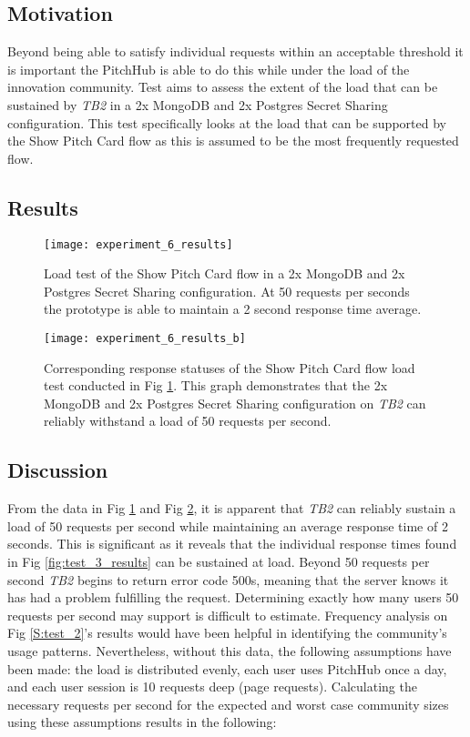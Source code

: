 \subsection{Motivation}
Beyond being able to satisfy individual requests within an acceptable threshold it is important the PitchHub is able to do this while under the load of the innovation community. Test  aims to assess the extent of the load that can be sustained by \textit{TB2} in a 2x MongoDB and 2x Postgres Secret Sharing configuration. This test specifically looks at the load that can be supported by the Show Pitch Card flow as this is assumed to be the most frequently requested flow.

\subsection{Results}

\begin{figure}[ht]
    \centering
    \texttt{[image: experiment\_6\_results]}
    \caption{Load test of the Show Pitch Card flow in a 2x MongoDB and 2x Postgres Secret Sharing configuration. At 50 requests per seconds the prototype is able to maintain a 2 second response time average. }
    \label{fig:test_6_results}
\end{figure}

\begin{figure}[ht]
    \centering
    \texttt{[image: experiment\_6\_results\_b]}
    \caption{Corresponding response statuses of the Show Pitch Card flow load test conducted in Fig \ref{fig:test_6_results}. This graph demonstrates that the 2x MongoDB and 2x Postgres Secret Sharing configuration on \textit{TB2} can reliably withstand a load of 50 requests per second.}
    \label{fig:test_6_results_b}
\end{figure}

\subsection{Discussion}
From the data in Fig \ref{fig:test_6_results} and Fig \ref{fig:test_6_results_b}, it is apparent that \textit{TB2} can reliably sustain a load of 50 requests per second while maintaining an average response time of 2 seconds. This is significant as it reveals that the individual response times found in Fig \ref{fig:test_3_results} can be sustained at load. Beyond 50 requests per second \textit{TB2} begins to return error code 500s, meaning that the server knows it has had a problem fulfilling the request.
Determining exactly how many users 50 requests per second may support is difficult to estimate. Frequency analysis on Fig \ref{S:test_2}'s results would have been helpful in identifying the community's usage patterns. Nevertheless, without this data, the following assumptions have been made: the load is distributed evenly, each user uses PitchHub once a day, and each user session is 10 requests deep (page requests). Calculating the necessary requests per second for the expected and worst case community sizes using these assumptions results in the following:

